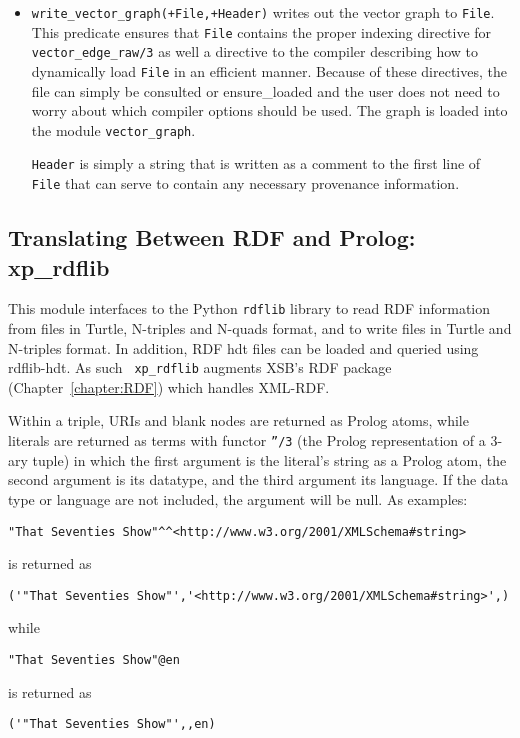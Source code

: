 \begin{itemize}
\item {\tt write\_vector\_graph(+File,+Header)} writes out the vector
  graph to {\tt File}.  This predicate ensures that {\tt File}
  contains the proper indexing directive for {\tt vector\_edge\_raw/3}
  as well a directive to the compiler describing how to dynamically
  load {\tt File} in an efficient manner.  Because of these
  directives, the file can simply be consulted or ensure\_loaded and
  the user does not need to worry about which compiler options should
  be used.  The graph is loaded into the module {\tt vector\_graph}.

  {\tt Header} is simply a string that is written as a comment to the
  first line of {\tt File} that can serve to contain any necessary
  provenance information.
\end{itemize}  

\subsection{Translating Between RDF and Prolog: xp\_rdflib} \label{secLxp-rdflib}
This module interfaces to the Python {\tt rdflib} library to read RDF
information from files in Turtle, N-triples and N-quads format, and to
write files in Turtle and N-triples format.  In addition, RDF hdt
files can be loaded and queried using rdflib-hdt.  As such {\tt
  xp\_rdflib} augments XSB's RDF package (Chapter~\ref{chapter:RDF})
which handles XML-RDF.

Within a triple, URIs and blank nodes are returned as Prolog atoms,
while literals are returned as terms with functor {\tt ''/3} (the
Prolog representation of a 3-ary tuple) in which the first argument is
the literal's string as a Prolog atom, the second argument is its
datatype, and the third argument its language. If the data type or
language are not included, the argument will be null.  As examples:

\begin{verbatim}
"That Seventies Show"^^<http://www.w3.org/2001/XMLSchema#string> 
\end{verbatim}
is returned as 
\begin{verbatim}
('"That Seventies Show"','<http://www.w3.org/2001/XMLSchema#string>',) 
\end{verbatim}
while 
\begin{verbatim}
"That Seventies Show"@en
\end{verbatim}
is returned as
\begin{verbatim}
('"That Seventies Show"',,en) 
\end{verbatim}

